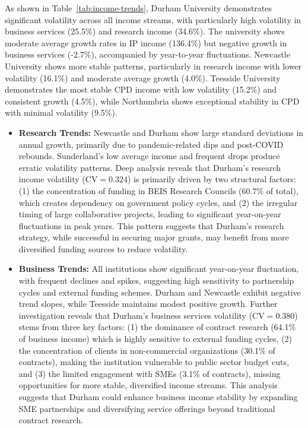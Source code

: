 \documentclass[journal,onecolumn, 10pt,draftclsnofoot]{IEEEtran}
\begin{document}
As shown in Table~\ref{tab:income-trends}, Durham University demonstrates significant volatility across all income streams, with particularly high volatility in business services (25.5\%) and research income (34.6\%). The university shows moderate average growth rates in IP income (136.4\%) but negative growth in business services (-2.7\%), accompanied by year-to-year fluctuations. Newcastle University shows more stable patterns, particularly in research income with lower volatility (16.1\%) and moderate average growth (4.0\%). Teesside University demonstrates the most stable CPD income with low volatility (15.2\%) and consistent growth (4.5\%), while Northumbria shows exceptional stability in CPD with minimal volatility (9.5\%).

\begin{itemize}
    \item \textbf{Research Trends:} Newcastle and Durham show large standard deviations in annual growth, primarily due to pandemic-related dips and post-COVID rebounds. Sunderland's low average income and frequent drops produce erratic volatility patterns. Deep analysis reveals that Durham's research income volatility ($\mathrm{CV}=0.324$) is primarily driven by two structural factors: (1) the concentration of funding in BEIS Research Councils (60.7\% of total), which creates dependency on government policy cycles, and (2) the irregular timing of large collaborative projects, leading to significant year-on-year fluctuations in peak years. This pattern suggests that Durham's research strategy, while successful in securing major grants, may benefit from more diversified funding sources to reduce volatility.
    
    \item \textbf{Business Trends:} All institutions show significant year-on-year fluctuation, with frequent declines and spikes, suggesting high sensitivity to partnership cycles and external funding schemes. Durham and Newcastle exhibit negative trend slopes, while Teesside maintains modest positive growth. Further investigation reveals that Durham's business services volatility ($\mathrm{CV}=0.380$) stems from three key factors: (1) the dominance of contract research (64.1\% of business income) which is highly sensitive to external funding cycles, (2) the concentration of clients in non-commercial organizations (30.1\% of contracts), making the institution vulnerable to public sector budget cuts, and (3) the limited engagement with SMEs (3.1\% of contracts), missing opportunities for more stable, diversified income streams. This analysis suggests that Durham could enhance business income stability by expanding SME partnerships and diversifying service offerings beyond traditional contract research.
    

\end{itemize}
\end{document}
